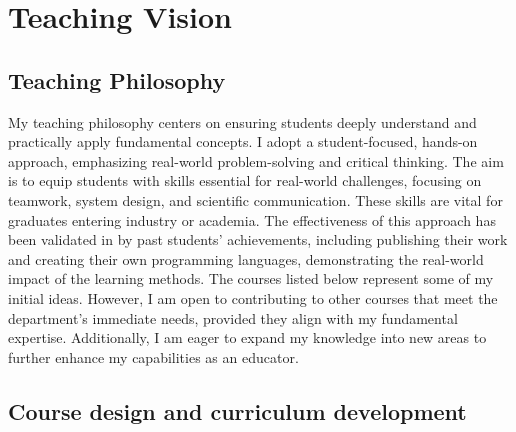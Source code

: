 \documentclass[10pt,a4paper,sans]{moderncv}
\begin{document}
\section*{Teaching Vision}

\vspace*{4ex}
\subsection*{Teaching Philosophy}

My teaching philosophy centers on ensuring students deeply understand and practically apply fundamental concepts. I adopt a student-focused, hands-on approach, emphasizing real-world problem-solving and critical thinking. The aim is to equip students with skills essential for real-world challenges, focusing on teamwork, system design, and scientific communication. These skills are vital for graduates entering industry or academia. The effectiveness of this approach has been validated in by past students' achievements, including publishing their work and creating their own programming languages, demonstrating the real-world impact of the learning methods. The courses listed below represent some of my initial ideas. However, I am open to contributing to other courses that meet the department's immediate needs, provided they align with my fundamental expertise. Additionally, I am eager to expand my knowledge into new areas to further enhance my capabilities as an educator.

\subsection*{Course design and curriculum development}
\end{document}
